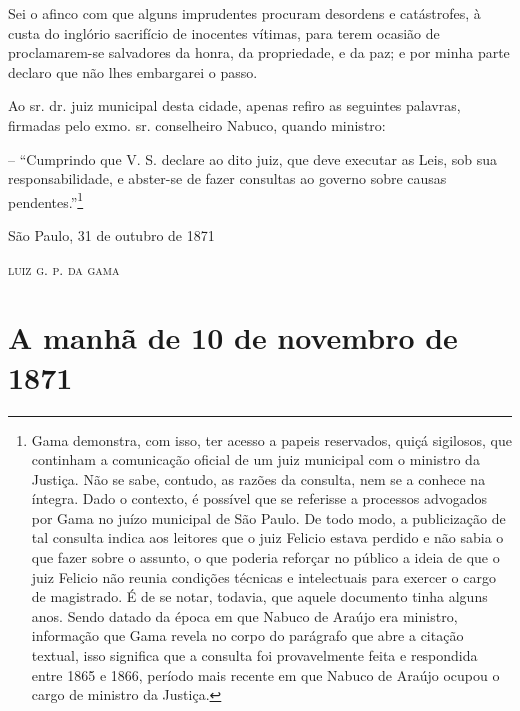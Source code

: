 {Sei o afinco com que alguns imprudentes procuram desordens e
catástrofes, à custa do inglório sacrifício de inocentes vítimas, para
terem ocasião de proclamarem-se salvadores da honra, da propriedade, e
da paz; e por minha parte declaro que não lhes embargarei o passo.

Ao sr. dr. juiz municipal desta cidade, apenas refiro as seguintes
palavras, firmadas pelo exmo. sr. conselheiro Nabuco, quando ministro:

-- ``Cumprindo que V. S. declare ao dito juiz, que deve executar as Leis,
sob sua responsabilidade, e abster-se de fazer consultas ao governo
sobre causas pendentes.''\footnote{ Gama demonstra, com isso, ter acesso
  a papeis reservados, quiçá sigilosos, que continham a comunicação
  oficial de um juiz municipal com o ministro da Justiça. Não se sabe,
  contudo, as razões da consulta, nem se a conhece na íntegra. Dado o
  contexto, é possível que se referisse a processos advogados por Gama
  no juízo municipal de São Paulo. De todo modo, a publicização de tal
  consulta indica aos leitores que o juiz Felicio estava perdido e não
  sabia o que fazer sobre o assunto, o que poderia reforçar no público a
  ideia de que o juiz Felicio não reunia condições técnicas e
  intelectuais para exercer o cargo de magistrado. É de se notar,
  todavia, que aquele documento tinha alguns anos. Sendo datado da época
  em que Nabuco de Araújo era ministro, informação que Gama revela no
  corpo do parágrafo que abre a citação textual, isso significa que a
  consulta foi provavelmente feita e respondida entre 1865 e 1866,
  período mais recente em que Nabuco de Araújo ocupou o cargo de
  ministro da Justiça.}

\begin{flushright}
São Paulo, 31 de outubro de 1871

\textsc{luiz g. p. da gama}
\end{flushright}

\part{A manhã de 10 de novembro de 1871}

}
